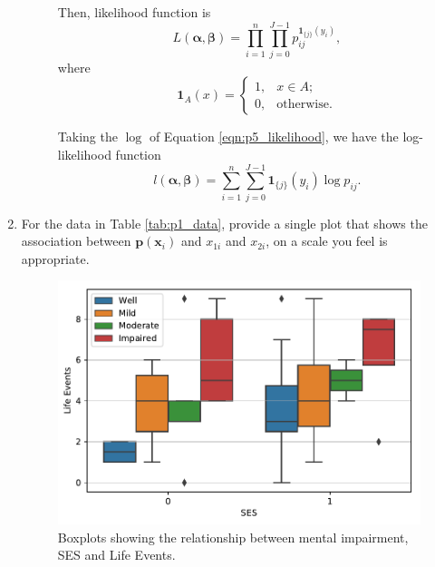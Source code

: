 \documentclass[letterpaper,11pt]{article}
\begin{document}
\begin{enumerate}
\begin{description}
    Then, likelihood function is
    \begin{equation}
      L\left(\bm\alpha, \bm\beta\right)
      = \prod_{i=1}^n \prod_{j=0}^{J-1} p_{ij}^{\mathbf{1}_{\{j\}}\left(y_i\right)},
      \label{eqn:p5_likelihood}
    \end{equation}
    where
    \begin{equation}
      \mathbf{1}_A\left(x\right) = \begin{cases}
        1,&x \in A; \\
        0,&\text{otherwise}.
      \end{cases}
      \label{eqn:p5_indicator}
    \end{equation}

    Taking the $\log$ of Equation \ref{eqn:p5_likelihood}, we have the
    log-likelihood function
    \begin{equation}
      l\left(\bm\alpha,\bm\beta\right)
      = \sum_{i=1}^n\sum_{j=0}^{J-1}\mathbf{1}_{\{j\}}\left(y_i\right) \log p_{ij}.
    \end{equation}    
  \end{description}  
\item For the data in Table \ref{tab:p1_data}, provide a single plot that shows
  the association between $\mathbf{p}\left(\mathbf{x}_i\right)$ and $x_{1i}$ and
  $x_{2i}$, on a scale you feel is appropriate.

  \begin{figure}
    \centering
    \includegraphics{p6_descriptive.pdf}
    \caption{Boxplots showing the relationship between mental impairment, SES
      and Life Events.}
    \label{fig:p6_descriptive}
  \end{figure}
  

\end{enumerate}
\end{document}
